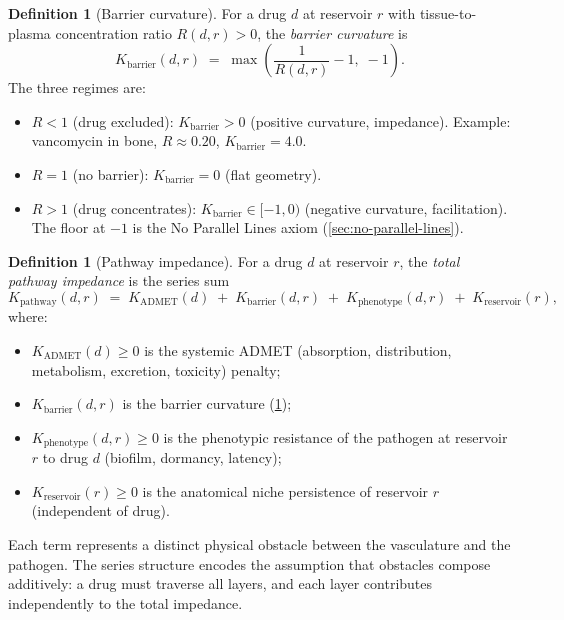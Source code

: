 \documentclass[11pt]{article}
\theoremstyle{plain}
\theoremstyle{definition}
\newtheorem{definition}[theorem]{Definition}
\newcommand{\Kpath}{K_{\mathrm{pathway}}}
\newcommand{\Kbarr}{K_{\mathrm{barrier}}}
\newcommand{\Kpheno}{K_{\mathrm{phenotype}}}
\newcommand{\Kres}{K_{\mathrm{reservoir}}}
\newcommand{\Kadmet}{K_{\mathrm{ADMET}}}
\begin{document}
\begin{definition}[Barrier curvature]
\label{def:kbarrier}
For a drug $d$ at reservoir $r$ with tissue-to-plasma
concentration ratio $R(d, r) > 0$, the \emph{barrier curvature}
is
\begin{equation}
  \label{eq:kbarrier}
  \Kbarr(d, r) \;=\; \max\!\left(\frac{1}{R(d, r)} - 1,\; -1\right).
\end{equation}
The three regimes are:
\begin{itemize}
  \item $R < 1$ (drug excluded): $\Kbarr > 0$ (positive curvature,
    impedance). Example: vancomycin in bone, $R \approx 0.20$,
    $\Kbarr = 4.0$.
  \item $R = 1$ (no barrier): $\Kbarr = 0$ (flat geometry).
  \item $R > 1$ (drug concentrates): $\Kbarr \in [-1, 0)$ (negative
    curvature, facilitation). The floor at $-1$ is the No Parallel
    Lines axiom (\cref{sec:no-parallel-lines}).
\end{itemize}
\end{definition}

\begin{definition}[Pathway impedance]
\label{def:kpathway}
For a drug $d$ at reservoir $r$, the \emph{total pathway
impedance} is the series sum
\begin{equation}
  \label{eq:kpathway}
  \Kpath(d, r) \;=\; \Kadmet(d) \;+\; \Kbarr(d, r)
    \;+\; \Kpheno(d, r) \;+\; \Kres(r),
\end{equation}
where:
\begin{itemize}
  \item $\Kadmet(d) \geq 0$ is the systemic ADMET
    (absorption, distribution, metabolism, excretion, toxicity) penalty;
  \item $\Kbarr(d, r)$ is the barrier curvature
    (\cref{def:kbarrier});
  \item $\Kpheno(d, r) \geq 0$ is the phenotypic resistance of the
    pathogen at reservoir $r$ to drug $d$ (biofilm, dormancy,
    latency);
  \item $\Kres(r) \geq 0$ is the anatomical niche persistence of
    reservoir $r$ (independent of drug).
\end{itemize}
Each term represents a distinct physical obstacle between the
vasculature and the pathogen. The series structure encodes the
assumption that obstacles compose additively: a drug must
traverse all layers, and each layer contributes independently to
the total impedance.
\end{definition}
\end{document}
